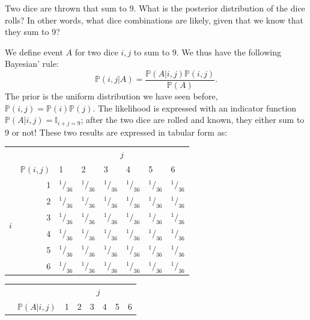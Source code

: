 \documentclass{article}
\begin{document}
\begin{testexample}
    Two dice are thrown that sum to 9. What is the posterior distribution of the dice rolls? In other words, what dice combinations are likely, given that we know that they sum to 9?
    
    We define event $A$ for two dice $i,j$ to sum to $9$. We thus have the following Bayesian' rule:
    \begin{equation}
        \mathbb{P}(i,j|A) = \frac{ \mathbb{P}(A|i,j)\mathbb{P}(i,j)}{\mathbb{P}(A)}.
    \end{equation}
    The prior is the uniform distribution we have seen before, $\mathbb{P}(i,j)=\mathbb{P}(i)\mathbb{P}(j)$. The likelihood is expressed with an indicator function $\mathbb{P}(A|i,j)=\mathbb{I}_{i+j=9}$; after the two dice are rolled and known, they either sum to 9 or not! These two results are expressed in tabular form as:
    \begin{center}
    \hfill
\begin{tabular}{@{}lr|llllll}
\toprule
 & & \multicolumn{6}{c}{$j$} \\ 
 &$\mathbb{P}(i,j)$ & 1 & 2 & 3 & 4 & 5 & 6 \\ \hline
\multirow{6}{*}{$i$} & 1 & $^{1\!}/_{\! 36}$ & $^{1\!}/_{\! 36}$ & $^{1\!}/_{\! 36}$ & $^{1\!}/_{\! 36}$ & $^{1\!}/_{\! 36}$ & $^{1\!}/_{\! 36}$ \\
 & 2 & $^{1\!}/_{\! 36}$ & $^{1\!}/_{\! 36}$ & $^{1\!}/_{\! 36}$ & $^{1\!}/_{\! 36}$ & $^{1\!}/_{\! 36}$ & $^{1\!}/_{\! 36}$ \\
 & 3 & $^{1\!}/_{\! 36}$ & $^{1\!}/_{\! 36}$ & $^{1\!}/_{\! 36}$ & $^{1\!}/_{\! 36}$ & $^{1\!}/_{\! 36}$ & $^{1\!}/_{\! 36}$ \\
 & 4 & $^{1\!}/_{\! 36}$ & $^{1\!}/_{\! 36}$ & $^{1\!}/_{\! 36}$ & $^{1\!}/_{\! 36}$ & $^{1\!}/_{\! 36}$ & $^{1\!}/_{\! 36}$ \\
 & 5 & $^{1\!}/_{\! 36}$ & $^{1\!}/_{\! 36}$ & $^{1\!}/_{\! 36}$ & $^{1\!}/_{\! 36}$ & $^{1\!}/_{\! 36}$ & $^{1\!}/_{\! 36}$ \\
 & 6 & $^{1\!}/_{\! 36}$ & $^{1\!}/_{\! 36}$ & $^{1\!}/_{\! 36}$ & $^{1\!}/_{\! 36}$ & $^{1\!}/_{\! 36}$ & $^{1\!}/_{\! 36}$ \\ \bottomrule
\end{tabular}
\hfill
\begin{tabular}{@{}lr|llllll}
\toprule
 & & \multicolumn{6}{c}{$j$} \\ 
 & $\mathbb{P}(A|i,j)$ & 1 & 2 & 3 & 4 & 5 & 6 \\ \hline

\end{tabular}
\end{center}
\end{testexample}
\end{document}
